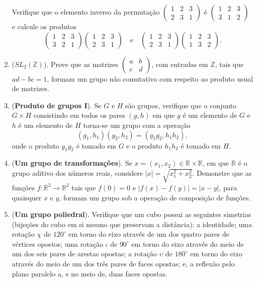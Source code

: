 \documentclass[a4paper,12pt]{article}
\begin{document}
\begin{enumerate}[label=8.\arabic*.]
    Verifique que o elemento inverso da permutação 
    \(
    \begin{pmatrix}1&2&3\\2&3&1\end{pmatrix}
    \) 
    é 
    \(
    \begin{pmatrix}1&2&3\\3&1&2\end{pmatrix}
    \) 
    e calcule os produtos 
    \[
    \begin{pmatrix}1&2&3\\3&2&1\end{pmatrix} 
    \begin{pmatrix}1&2&3\\2&3&1\end{pmatrix} 
    \quad \text{e} \quad 
    \begin{pmatrix}1&2&3\\2&3&1\end{pmatrix} 
    \begin{pmatrix}1&2&3\\1&3&2\end{pmatrix}.
    \]

    \item (\textbf{$SL_2(\mathbb{Z})$}). Prove que as matrizes 
    \(
    \begin{pmatrix}a & b \\ c & d \end{pmatrix}
    \), com entradas em $\mathbb{Z}$, tais que $ad - bc = 1$, formam um grupo não comutativo com respeito ao produto usual de matrizes. 

    \item (\textbf{Produto de grupos I}). Se $G$ e $H$ são grupos, verifique que o conjunto 
    $G \times H$ consistindo em todos os pares $(g,h)$ em que $g$ é um elemento de $G$ e $h$ é um elemento de $H$ 
    torna-se um grupo com a operação 
    \[
    (g_1,h_1)(g_2,h_2) = (g_1g_2, h_1h_2),
    \] 
    onde o produto $g_1g_2$ é tomado em $G$ e o produto $h_1h_2$ é tomado em $H$.

    \item (\textbf{Um grupo de transformações}). Se $x = (x_1, x_2) \in \mathbb{R} \times \mathbb{R}$, em que $\mathbb{R}$ é o grupo aditivo dos números reais, considere $|x| = \sqrt{x_1^2 + x_2^2}$. Demonstre que as funções $f : \mathbb{R}^2 \to \mathbb{R}^2$ tais que $f(0) = 0$ e $|f(x) - f(y)| = |x - y|$, para quaisquer $x$ e $y$, formam um grupo sob a operação de composição de funções. 

    \item (\textbf{Um grupo poliedral}). Verifique que um cubo possui as seguintes simetrias (bijeções do cubo em si mesmo que preservam a distância): a identidade; uma rotação $\chi$ de $120^\circ$ em torno do eixo através de um dos quatro pares de vértices opostos; uma rotação $\iota$ de $90^\circ$ em torno do eixo através do meio de um dos seis pares de arestas opostas; a rotação $\upsilon$ de $180^\circ$ em torno do eixo através do meio de um dos três pares de faces opostas; e, a reflexão pelo plano paralelo a, e no meio de, duas faces opostas. 


\end{enumerate}
\end{document}

